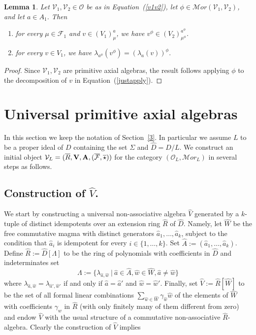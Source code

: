 \documentclass[a4paper]{amsart}
\newtheorem{lemma}{Lemma}[section]
\newcommand{\Amo}{{\mathcal {\bf A}}}
\newcommand{\A}{ {\hat A}}
\newcommand{\Ro}{{\overline R}}
\newcommand{\Vo}{{\bf V}}
\newcommand{\aV}{{\hat V}}
\newcommand{\aR}{{\hat R}}
\newcommand{\hW}{{\hat W}}
\newcommand{\ha}{{\hat a}}
\newcommand{\hw}{{\hat w}}
\begin{document}
\begin{lemma} \label{omolambda}
Let ${\mathcal  V_1},{\mathcal V_2} \in \mathcal O$ be as in Equation~(\ref{v1v2}), let $\phi \in {\mathcal Mor}({\mathcal V_1},{\mathcal V_2})$, and let $a\in A_1$. Then
\begin{enumerate}
\item for every $\mu\in \mathcal{F}_1$ and $v\in (V_1)^a_{\mu}$, we have $v^{\phi}\in (V_2)^{a^\phi}_{\mu^{\phi}}$.
\item for every $v\in V_1$, we have
$
\lambda_{a^\phi}(v^{\phi})=(\lambda_{a}(v))^{\phi}.
$
\end{enumerate}
\end{lemma}
\begin{proof}
Since ${\mathcal V_1},{\mathcal V_2} $ are primitive axial algebras, the result  follows applying $\phi$  to the decomposition of $v$ in Equation~(\ref{justapply}). 
\end{proof}

\section{Universal primitive axial algebras}\label{universal}

In this section we keep the notation of Section~\ref{3}. In particular we assume $L$ to be a proper ideal of $D$ containing the set $\Sigma$ and $\hat D=D/L$. We construct an initial object $\mathcal V_L=(\Ro,\Vo, \Amo, (\overline{\mathcal F}, \overline \star))$ for the category $(\mathcal O_L, {\mathcal Mor}_L) $ in several steps as follows. 

\subsection{Construction of $\aV$.} 

We start by constructing a universal non-associative algebra $\aV$ generated by a $k$-tuple of distinct idempotents over an extension ring $\aR$ of $\hat D$. Namely, let  $\hW$ be the free commutative magma with distinct generators $\ha_1,\ldots , \ha_k$, subject to the condition that $\ha_i$ is idempotent for every $i\in \{1, \ldots , k\}$. Set 
$\A:=(\ha_1,\ldots , \ha_k) $.  
%
Define $\aR:={\hat D}[\Lambda]$ to be the ring of polynomials with coefficients in $\hat D$ and  indeterminates set  
$$\Lambda:=\{\lambda_{ \ha,  \hw}\:|\: \ha \in \A,  \hw\in \hW, \ha\neq \hw\}
$$ where $\lambda_{ \ha,  \hw}=\lambda_{ \ha',  \hw'}
$ if and only if $ \ha= \ha'$ and $ \hw= \hw'$.
Finally, set $\aV:=\aR[\hW]$ to be the set of all formal linear combinations $\sum_{\hw\in \hW}\gamma_\hw \hw$ of the elements of $\hW$ with coefficients $\gamma_w$ in $\aR$ (with only finitely many of them different from zero) and endow $\aV$ with  the usual structure of a commutative non-associative $\aR$-algebra. Clearly the construction of $\hat V$ implies
\end{document}
